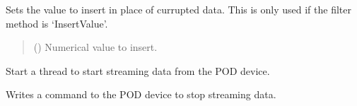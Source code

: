 \documentclass[letterpaper,10pt,english]{sphinxmanual}
\begin{document}
\begin{fulllineitems}
\begin{fulllineitems}
\label{\detokenize{Morelia.Stream.Collect:Morelia.Stream.Collect.DataHose.Hose.SetFilterInsertValue}}
\pysigstartsignatures
{}
\pysigstopsignatures
\sphinxAtStartPar
Sets the value to insert in place of currupted data. This is only used if the filter method is ‘InsertValue’.
\begin{quote}\begin{description}
\sphinxAtStartPar
{} () \textendash{} Numerical value to insert.

\end{description}\end{quote}

\end{fulllineitems}


\begin{fulllineitems}
\label{\detokenize{Morelia.Stream.Collect:Morelia.Stream.Collect.DataHose.Hose.StartStream}}
\pysigstartsignatures
{}
\pysigstopsignatures
\sphinxAtStartPar
Start a thread to start streaming data from the POD device.

\end{fulllineitems}


\begin{fulllineitems}
\label{\detokenize{Morelia.Stream.Collect:Morelia.Stream.Collect.DataHose.Hose.StopStream}}
\pysigstartsignatures
{}
\pysigstopsignatures
\sphinxAtStartPar
Writes a command to the POD device to stop streaming data.

\end{fulllineitems}



\end{fulllineitems}
\end{document}
